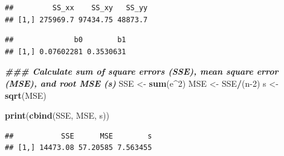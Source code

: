 \documentclass[
]{article}
\newenvironment{Shaded}{\begin{snugshade}}{\end{snugshade}}
\newcommand{\DecValTok}[1]{\textcolor[rgb]{0.00,0.00,0.81}{#1}}
\newcommand{\DocumentationTok}[1]{\textcolor[rgb]{0.56,0.35,0.01}{\textbf{\textit{#1}}}}
\newcommand{\FunctionTok}[1]{\textcolor[rgb]{0.13,0.29,0.53}{\textbf{#1}}}
\newcommand{\NormalTok}[1]{#1}
\newcommand{\OtherTok}[1]{\textcolor[rgb]{0.56,0.35,0.01}{#1}}
\newcommand{\SpecialCharTok}[1]{\textcolor[rgb]{0.81,0.36,0.00}{\textbf{#1}}}
\begin{document}
\begin{verbatim}
##         SS_xx    SS_xy   SS_yy
## [1,] 275969.7 97434.75 48873.7
\end{verbatim}

\begin{Shaded}
\end{Shaded}

\begin{verbatim}
##              b0        b1
## [1,] 0.07602281 0.3530631
\end{verbatim}

\begin{Shaded}
\begin{Highlighting}[]
\DocumentationTok{\#\#\# Calculate sum of square errors (SSE), mean square error (MSE), and root MSE (s)}
\NormalTok{SSE }\OtherTok{\textless{}{-}} \FunctionTok{sum}\NormalTok{(e}\SpecialCharTok{\^{}}\DecValTok{2}\NormalTok{)}
\NormalTok{MSE }\OtherTok{\textless{}{-}}\NormalTok{ SSE}\SpecialCharTok{/}\NormalTok{(n}\DecValTok{{-}2}\NormalTok{)}
\NormalTok{s }\OtherTok{\textless{}{-}} \FunctionTok{sqrt}\NormalTok{(MSE)}

\FunctionTok{print}\NormalTok{(}\FunctionTok{cbind}\NormalTok{(SSE, MSE, s))}
\end{Highlighting}
\end{Shaded}

\begin{verbatim}
##           SSE      MSE        s
## [1,] 14473.08 57.20585 7.563455
\end{verbatim}
\end{document}

